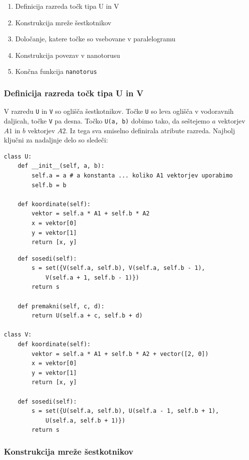 \documentclass[a4paper, 11 pt]{article}
\begin{document}
\begin{enumerate}
\item Definicija razreda točk tipa U in V
\item Konstrukcija mreže šestkotnikov
\item Določanje, katere točke so vsebovane v paralelogramu
\item Konstrukcija povezav v nanotorusu
\item Končna funkcija \texttt{nanotorus}
\end{enumerate}

\subsubsection{Definicija razreda točk tipa U in V}

V razredu \texttt{U} in \texttt{V} so oglišča šestkotnikov. Točke \texttt{U} so leva oglišča v vodoravnih daljicah, točke \texttt{V} pa desna. Točko \texttt{U(a, b)} dobimo tako, da seštejemo $a$ vektorjev $A1$ in $b$ vektorjev $A2$. Iz tega sva smiselno definirala atribute razreda. Najbolj ključni za nadaljnje delo so sledeči:

\begin{verbatim}
class U:
    def __init__(self, a, b):
        self.a = a # a konstanta ... koliko A1 vektorjev uporabimo
        self.b = b

    def koordinate(self):
        vektor = self.a * A1 + self.b * A2
        x = vektor[0]
        y = vektor[1]
        return [x, y]
\end{verbatim}
        
\pagebreak

\begin{verbatim}
    def sosedi(self):
        s = set({V(self.a, self.b), V(self.a, self.b - 1), 
        	V(self.a + 1, self.b - 1)})
        return s
    
    def premakni(self, c, d):
        return U(self.a + c, self.b + d)

class V:       
    def koordinate(self):
        vektor = self.a * A1 + self.b * A2 + vector([2, 0])
        x = vektor[0]
        y = vektor[1]
        return [x, y]
    
    def sosedi(self):
        s = set({U(self.a, self.b), U(self.a - 1, self.b + 1), 
        	U(self.a, self.b + 1)})
        return s
\end{verbatim}

\subsubsection{Konstrukcija mreže šestkotnikov}
\end{document}
